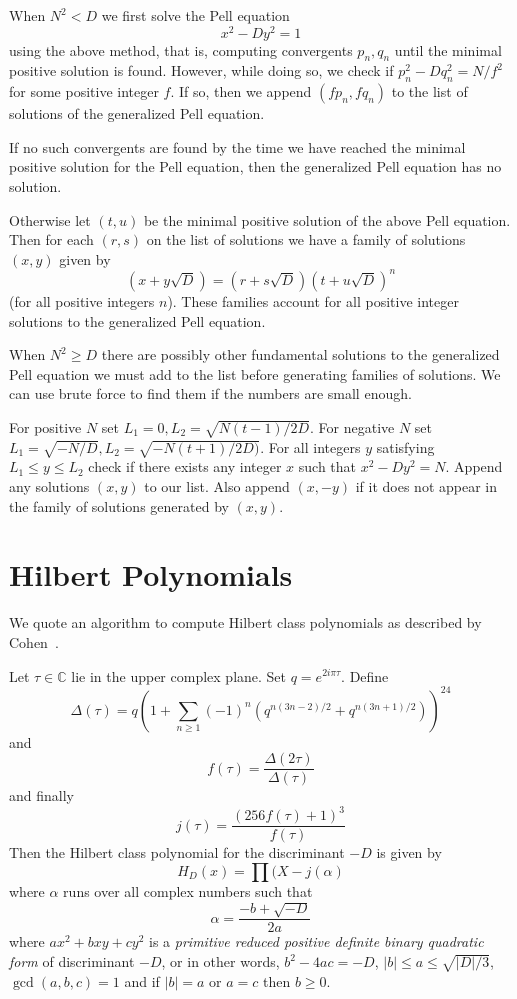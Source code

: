 When $N^2 < D$ we first solve the Pell equation
\[ x^2 - D y^2 = 1 \]
using the above method, that is, computing convergents $p_n, q_n$
until the minimal positive solution is found. However,
while doing so, we check if $p_n^2 - D q_n^2 = N / f^2$ for
some positive integer $f$. If so, then we append $(f p_n, f q_n)$ to
the list of solutions of the generalized Pell equation.

If no such convergents are found by the time we have reached the minimal
positive solution for the Pell equation, then the generalized Pell
equation has no solution.

Otherwise let $(t, u)$ be the minimal positive solution of the above
Pell equation.
Then for each $(r,s)$ on the list of solutions we have a family of
solutions $(x,y)$ given by
\[ (x+y\sqrt{D}) = (r+s\sqrt{D})(t+u\sqrt{D})^n \]
(for all positive integers $n$). These families account for all positive
integer solutions to the generalized Pell equation.

When $N^2 \ge D$ there are possibly other fundamental solutions
to the generalized Pell equation we must add to the list before generating
families of solutions.
We can use brute force to find them if the numbers are small enough.

For positive $N$ set $L_1=0, L_2 =\sqrt{N(t-1)/2D}$. For negative $N$
set $L_1 = \sqrt{-N/D}, L_2=\sqrt{-N(t+1)/2D)}$. For all integers $y$
satisfying $L_1\le y \le L_2$ check if there exists any integer $x$ such that
$x^2 - Dy^2 = N$.
Append any solutions $(x,y)$ to our list. Also append $(x,-y)$ if
it does not appear in the family of solutions generated by $(x, y)$.

\section {Hilbert Polynomials}

We quote an algorithm to compute Hilbert class
polynomials as described by Cohen~\cite[section 7.6.2]{1993-cohen}.

Let $\tau \in \mathbb{C}$ lie in the upper complex plane.
Set $q = e^{2 i \pi \tau}$. Define
\[
\Delta(\tau) = q\left(1+\sum_{n\ge1}(-1)^n
\left({q^{n(3n-2)/2} + q^{n(3n+1)/2}}\right)\right)^{24}
\]
and
\[
f(\tau) = \frac{\Delta(2\tau)}{\Delta(\tau)}
\]
and finally
\[
j(\tau) = \frac{(256 f(\tau) + 1)^3}{f(\tau)}
\]
Then the Hilbert class polynomial for the discriminant $-D$ is
given by
\[ H_D(x) = \prod (X - j(\alpha) \]
where $\alpha$ runs over all complex numbers such that
\[ \alpha = \frac{-b+\sqrt{-D}}{2a} \]
where $ax^2 + bxy + cy^2$ is a \emph{primitive reduced positive definite
binary quadratic form} of discriminant $-D$, or in other words,
$b^2 - 4ac = -D$, $|b| \le a \le \sqrt{|D|/3}$, $\gcd(a,b,c)=1$ and
if $|b| = a$ or $a=c$ then $b\ge0$.

